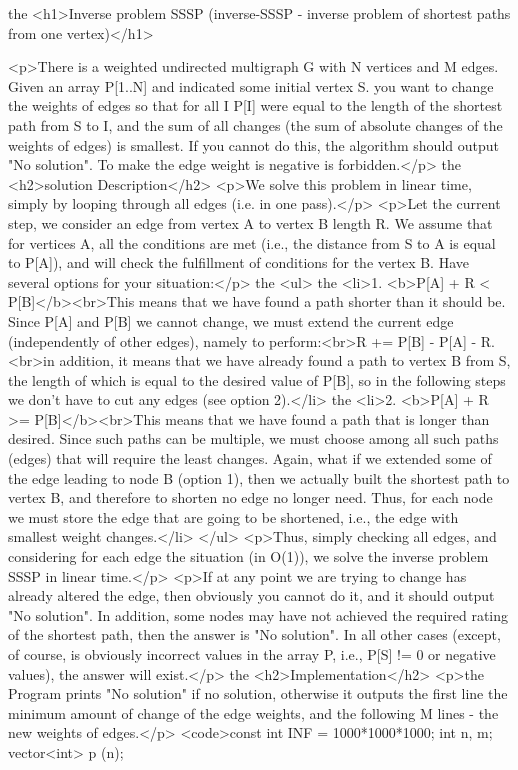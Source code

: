 the <h1>Inverse problem SSSP (inverse-SSSP - inverse problem of shortest paths from one vertex)</h1>

<p>There is a weighted undirected multigraph G with N vertices and M edges. Given an array P[1..N] and indicated some initial vertex S. you want to change the weights of edges so that for all I P[I] were equal to the length of the shortest path from S to I, and the sum of all changes (the sum of absolute changes of the weights of edges) is smallest. If you cannot do this, the algorithm should output "No solution". To make the edge weight is negative is forbidden.</p>
the <h2>solution Description</h2>
<p>We solve this problem in linear time, simply by looping through all edges (i.e. in one pass).</p>
<p>Let the current step, we consider an edge from vertex A to vertex B length R. We assume that for vertices A, all the conditions are met (i.e., the distance from S to A is equal to P[A]), and will check the fulfillment of conditions for the vertex B. Have several options for your situation:</p>
the <ul>
the <li>1. <b>P[A] + R < P[B]</b><br>This means that we have found a path shorter than it should be. Since P[A] and P[B] we cannot change, we must extend the current edge (independently of other edges), namely to perform:<br>R += P[B] - P[A] - R.<br>in addition, it means that we have already found a path to vertex B from S, the length of which is equal to the desired value of P[B], so in the following steps we don't have to cut any edges (see option 2).</li>
the <li>2. <b>P[A] + R >= P[B]</b><br>This means that we have found a path that is longer than desired. Since such paths can be multiple, we must choose among all such paths (edges) that will require the least changes. Again, what if we extended some of the edge leading to node B (option 1), then we actually built the shortest path to vertex B, and therefore to shorten no edge no longer need. Thus, for each node we must store the edge that are going to be shortened, i.e., the edge with smallest weight changes.</li>
</ul>
<p>Thus, simply checking all edges, and considering for each edge the situation (in O(1)), we solve the inverse problem SSSP in linear time.</p>
<p>If at any point we are trying to change has already altered the edge, then obviously you cannot do it, and it should output "No solution". In addition, some nodes may have not achieved the required rating of the shortest path, then the answer is "No solution". In all other cases (except, of course, is obviously incorrect values in the array P, i.e., P[S] != 0 or negative values), the answer will exist.</p>
the <h2>Implementation</h2>
<p>the Program prints "No solution" if no solution, otherwise it outputs the first line the minimum amount of change of the edge weights, and the following M lines - the new weights of edges.</p>
<code>const int INF = 1000*1000*1000;
int n, m;
vector<int> p (n);


